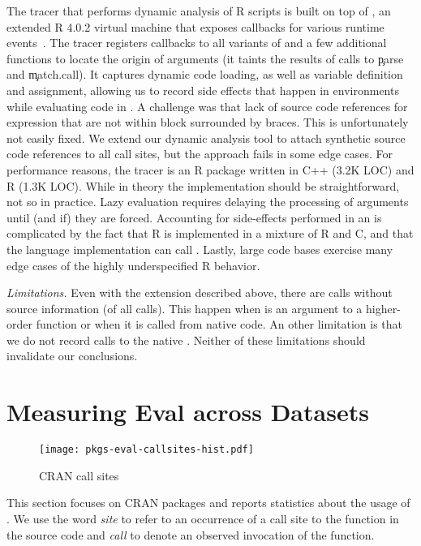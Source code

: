 \documentclass[screen,acmsmall]{acmart}
\newcommand{\mypara}[1]{\medskip\noindent\emph{#1}\xspace}
\begin{document}
The tracer that performs dynamic analysis of R scripts is built on top of
\rdyntrace, an extended R 4.0.2 virtual machine that exposes callbacks for
various runtime events~\cite{oopsla19b}. The tracer registers callbacks to all
variants of \eval and a few additional functions to locate the origin of \eval
arguments (it taints the results of calls to \c{parse} and \c{match.call}). It
captures dynamic code loading, as well as variable definition and assignment,
allowing us to record side effects that happen in environments while evaluating
code in \eval. A challenge was that lack of source code references for
expression that are not within block surrounded by braces. This is unfortunately
not easily fixed. We extend our dynamic analysis tool to attach synthetic source
code references to all \eval call sites, but the approach fails in some edge
cases. For performance reasons, the tracer is an R package written in C++ (3.2K
LOC) and R (1.3K LOC). While in theory the implementation should be
straightforward, not so in practice. Lazy evaluation requires delaying the
processing of arguments until (and if) they are forced. Accounting for
side-effects performed in an \eval is complicated by the fact that R is
implemented in a mixture of R and C, and that the language implementation can
call \eval. Lastly, large code bases exercise many edge cases of the highly
underspecified R behavior.

\mypara{Limitations.} Even with the extension described above, there are
\PkgUndefinedRnd \eval calls without source information (\PkgUndefinedRatio of
all \eval calls). This happen when \eval is an argument to a higher-order
function or when it is called from native code. An other limitation is that we
do not record calls to the native \eval. Neither of these limitations should
invalidate our conclusions.

\newpage
\section{Measuring Eval across Datasets}

\begin{wrapfigure}{r}{5cm} \vspace{-1cm} \hspace*{-12mm}
  \centering
  \texttt{[image: pkgs-eval-callsites-hist.pdf]}
  \caption{CRAN \eval call sites}%
  \label{fig:pkgs-eval-callsites-hist}\vspace{-3mm}
\end{wrapfigure}
%
This section focuses on CRAN packages and reports statistics about the usage of
\eval. We use the word \emph{site} to refer to an occurrence of a call site to the \eval
function in the source code and \emph{call} to denote an observed invocation of
the \eval function.
\end{document}
